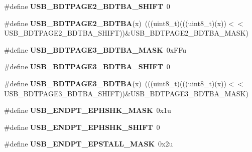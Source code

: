 \begin{DoxyCompactItemize}
\#define {\bfseries U\+S\+B\+\_\+\+B\+D\+T\+P\+A\+G\+E2\+\_\+\+B\+D\+T\+B\+A\+\_\+\+S\+H\+I\+FT}~0
\item 
\mbox{\label{group___u_s_b___register___masks_ga1b7b12b3e6686e4b15b1cfa072a805eb}} 
\#define {\bfseries U\+S\+B\+\_\+\+B\+D\+T\+P\+A\+G\+E2\+\_\+\+B\+D\+T\+BA}(x)~(((uint8\+\_\+t)(((uint8\+\_\+t)(x))$<$$<$U\+S\+B\+\_\+\+B\+D\+T\+P\+A\+G\+E2\+\_\+\+B\+D\+T\+B\+A\+\_\+\+S\+H\+I\+FT))\&U\+S\+B\+\_\+\+B\+D\+T\+P\+A\+G\+E2\+\_\+\+B\+D\+T\+B\+A\+\_\+\+M\+A\+SK)
\item 
\mbox{\label{group___u_s_b___register___masks_ga9081479345a744c85a74643600921b64}} 
\#define {\bfseries U\+S\+B\+\_\+\+B\+D\+T\+P\+A\+G\+E3\+\_\+\+B\+D\+T\+B\+A\+\_\+\+M\+A\+SK}~0x\+F\+Fu
\item 
\mbox{\label{group___u_s_b___register___masks_ga9850caac94013a6e84f9af9cbe0e0827}} 
\#define {\bfseries U\+S\+B\+\_\+\+B\+D\+T\+P\+A\+G\+E3\+\_\+\+B\+D\+T\+B\+A\+\_\+\+S\+H\+I\+FT}~0
\item 
\mbox{\label{group___u_s_b___register___masks_ga1576cadd83c016ae56239b96238ffeb8}} 
\#define {\bfseries U\+S\+B\+\_\+\+B\+D\+T\+P\+A\+G\+E3\+\_\+\+B\+D\+T\+BA}(x)~(((uint8\+\_\+t)(((uint8\+\_\+t)(x))$<$$<$U\+S\+B\+\_\+\+B\+D\+T\+P\+A\+G\+E3\+\_\+\+B\+D\+T\+B\+A\+\_\+\+S\+H\+I\+FT))\&U\+S\+B\+\_\+\+B\+D\+T\+P\+A\+G\+E3\+\_\+\+B\+D\+T\+B\+A\+\_\+\+M\+A\+SK)
\item 
\mbox{\label{group___u_s_b___register___masks_ga9266b40af26177a6659041e0229e76e7}} 
\#define {\bfseries U\+S\+B\+\_\+\+E\+N\+D\+P\+T\+\_\+\+E\+P\+H\+S\+H\+K\+\_\+\+M\+A\+SK}~0x1u
\item 
\mbox{\label{group___u_s_b___register___masks_ga477c6b1ea91137b6ebd65d0574a7b611}} 
\#define {\bfseries U\+S\+B\+\_\+\+E\+N\+D\+P\+T\+\_\+\+E\+P\+H\+S\+H\+K\+\_\+\+S\+H\+I\+FT}~0
\item 
\mbox{\label{group___u_s_b___register___masks_ga57a65ef14a5d868dcd964177fe6daad2}} 
\#define {\bfseries U\+S\+B\+\_\+\+E\+N\+D\+P\+T\+\_\+\+E\+P\+S\+T\+A\+L\+L\+\_\+\+M\+A\+SK}~0x2u

\end{DoxyCompactItemize}
